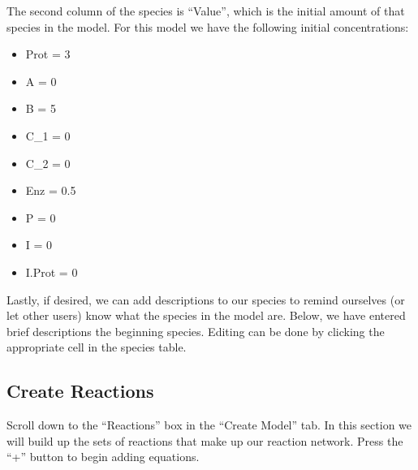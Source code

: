 \documentclass[letterpaper,10pt,english]{sphinxmanual}
\begin{document}
\sphinxAtStartPar
The second column of the species is “Value”, which is the initial amount of
that species in the model.  For this model we have the following initial
concentrations:
\begin{itemize}
\item {} 
\sphinxAtStartPar
Prot = 3

\item {} 
\sphinxAtStartPar
A = 0

\item {} 
\sphinxAtStartPar
B = 5

\item {} 
\sphinxAtStartPar
C\_1 = 0

\item {} 
\sphinxAtStartPar
C\_2 = 0

\item {} 
\sphinxAtStartPar
Enz = 0.5

\item {} 
\sphinxAtStartPar
P = 0

\item {} 
\sphinxAtStartPar
I = 0

\item {} 
\sphinxAtStartPar
I.Prot = 0

\end{itemize}

\begin{figure}[htbp]
\centering

\noindent{}
\end{figure}

\sphinxAtStartPar
Lastly, if desired, we can add descriptions to our species to remind ourselves
(or let other users) know what the species in the model are.  Below, we have
entered brief descriptions the beginning species. Editing can be done by
clicking the appropriate cell in the species table.

\begin{figure}[htbp]
\centering

\noindent{}
\end{figure}


\subsection{Create Reactions}
\label{\detokenize{pages/tutorial_sc/createEquations:create-reactions}}\label{\detokenize{pages/tutorial_sc/createEquations::doc}}
\sphinxAtStartPar
Scroll down to the “Reactions” box in the “Create Model” tab. In this
section we will build up the sets of reactions that make up our reaction
network.  Press the “+” button to begin adding equations.
\end{document}
